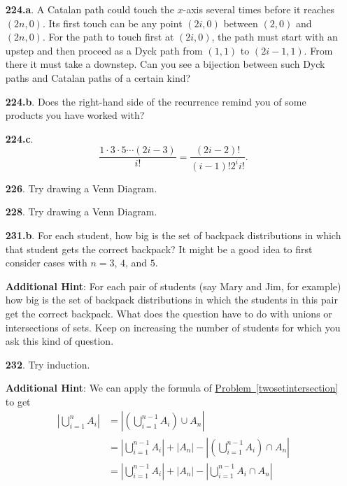 \documentclass[10pt,]{book}
\theoremstyle{plain}
\theoremstyle{definition}
\theoremstyle{definition}
\numberwithin{equation}{chapter}
\newcommand{\amp}{&}
\begin{document}
\begin{itemize}[itemsep=1em]
\item[\textbf{224.a}.]\hypertarget{p-1276}{}%
A Catalan path could touch the \(x\)-axis several times before it reaches \((2n, 0)\).  Its first touch can be any point \((2i, 0)\) between \((2, 0)\) and \((2n, 0)\). For the path to touch first at \((2i, 0)\), the path must start with an upstep and then proceed as a Dyck path from \((1, 1)\) to \((2i - 1, 1)\). From there it must take a downstep. Can you see a bijection between such Dyck paths and Catalan paths of a certain kind?%

\item[\textbf{224.b}.]\hypertarget{p-1279}{}%
Does the right-hand side of the recurrence remind you of some products you have worked with?%

\item[\textbf{224.c}.]\hypertarget{p-1282}{}%
%
\begin{equation*}
\frac{1\cdot 3\cdot 5\cdots (2i-3)}{i!} = \frac{(2i-2)!}{(i-1)!2^i i!}\text{.}
\end{equation*}
%

\item[\textbf{226}.]\hypertarget{p-1321}{}%
Try drawing a Venn Diagram.%

\item[\textbf{228}.]\hypertarget{p-1327}{}%
Try drawing a Venn Diagram.%

\item[\textbf{231.b}.]\hypertarget{p-1339}{}%
For each student, how big is the set of backpack distributions in which that student gets the correct backpack?  It might be a good idea to first consider cases with \(n=3\), \(4\), and \(5\).%

\par\smallskip
\noindent\textbf{Additional Hint}: \hypertarget{p-1340}{}%
For each pair of students (say Mary and Jim, for example) how big is the set of backpack distributions in which the students in this pair get the correct backpack. What does the question have to do with unions or intersections of sets. Keep on increasing the number of students for which you ask this kind of question.%

\item[\textbf{232}.]\hypertarget{p-1351}{}%
Try induction.%

\par\smallskip
\noindent\textbf{Additional Hint}: \hypertarget{p-1352}{}%
We can apply the formula of \hyperref[twosetintersection]{Problem~\ref{twosetintersection}} to get%
\begin{align*}
\left|\bigcup_{i=1}^n A_i \right| \amp = \left|\left(\bigcup_{i=1}^{n-1} A_i\right) \cup A_n \right| \\
\amp = \left| \bigcup_{i=1}^{n-1} A_i\right| + |A_n| - \left|\left( \bigcup_{i=1}^{n-1} A_i\right) \cap A_n\right|\\
\amp = \left| \bigcup_{i=1}^{n-1} A_i\right| + |A_n| - \left|\bigcup_{i=1}^{n-1} A_i \cap A_n\right|
\end{align*}
%


\end{itemize}
\end{document}
